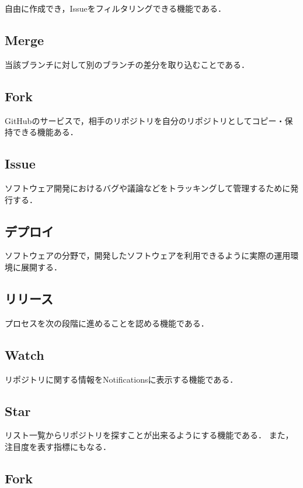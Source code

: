 自由に作成でき，Issueをフィルタリングできる機能である．


\subsection{Merge}

当該ブランチに対して別のブランチの差分を取り込むことである．


\subsection{Fork}

GitHubのサービスで，相手のリポジトリを自分のリポジトリとしてコピー・保持できる機能ある．


\subsection{Issue}

ソフトウェア開発におけるバグや議論などをトラッキングして管理するために発行する．

\subsection{デプロイ}

ソフトウェアの分野で，開発したソフトウェアを利用できるように実際の運用環境に展開する．


\subsection{リリース}

プロセスを次の段階に進めることを認める機能である．


\subsection{Watch}

リポジトリに関する情報をNotificationsに表示する機能である．

\subsection{Star}

リスト一覧からリポジトリを探すことが出来るようにする機能である．
また，注目度を表す指標にもなる．

\subsection{Fork}

